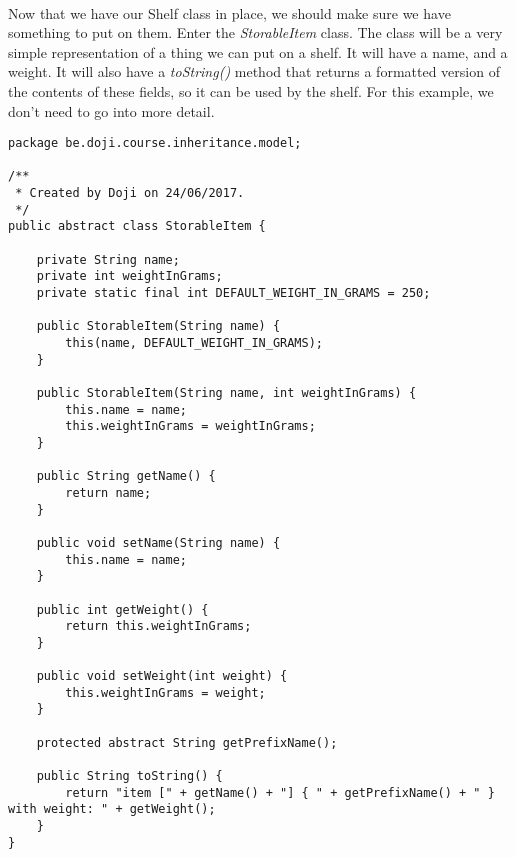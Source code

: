 \documentclass[11pt,fleqn]{book} %
\begin{document}
\paragraph{}
Now that we have our Shelf class in place, we should make sure we have something to put on them. Enter the \emph{StorableItem} class.
The class will be a very simple representation of a thing we can put on a shelf. It will have a name, and a weight. It will also have a \emph{toString()} method that returns a formatted version of the contents of these fields, so it can be used by the shelf. For this example, we don't need to go into more detail.

\begin{lstlisting}[caption=StorableItem.java]
package be.doji.course.inheritance.model;

/**
 * Created by Doji on 24/06/2017.
 */
public abstract class StorableItem {

    private String name;
    private int weightInGrams;
    private static final int DEFAULT_WEIGHT_IN_GRAMS = 250;

    public StorableItem(String name) {
        this(name, DEFAULT_WEIGHT_IN_GRAMS);
    }

    public StorableItem(String name, int weightInGrams) {
        this.name = name;
        this.weightInGrams = weightInGrams;
    }

    public String getName() {
        return name;
    }

    public void setName(String name) {
        this.name = name;
    }

    public int getWeight() {
        return this.weightInGrams;
    }

    public void setWeight(int weight) {
        this.weightInGrams = weight;
    }

    protected abstract String getPrefixName();

    public String toString() {
        return "item [" + getName() + "] { " + getPrefixName() + " } with weight: " + getWeight();
    }
}
\end{lstlisting}
\end{document}
